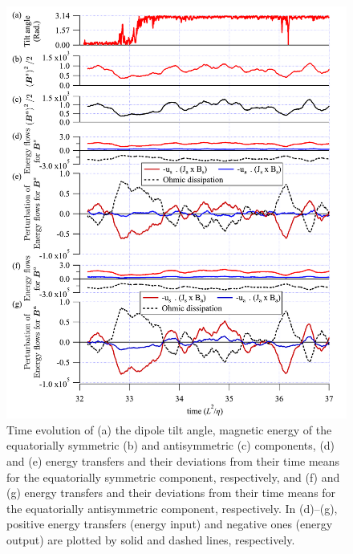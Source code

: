 \begin{figure}[ht]
\hspace*{\fill}
\includegraphics*[width=120mm]
{Figures/retry1_1_Mfluxes.pdf}
\hspace*{\fill}
\caption{
Time evolution of (a) the dipole tilt angle, magnetic energy of the equatorially symmetric (b) and antisymmetric (c) components, (d) and (e) energy transfers and their deviations from their time means for the equatorially symmetric component, respectively, and (f) and (g) energy transfers and their deviations from their time means for the equatorially antisymmetric component, respectively.
In (d)--(g), positive energy transfers (energy input) and negative ones (energy output) are plotted by solid and dashed lines, respectively.
}
\label{fig:mag_energy_flux_evolution_retry1_1}
\end{figure}